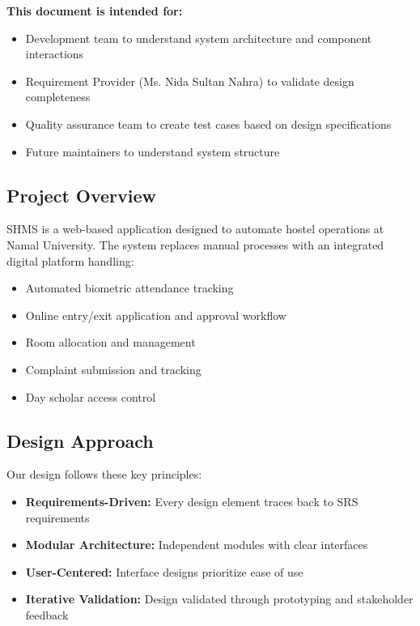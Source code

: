 \documentclass[12pt]{article}
\begin{document}
\textbf{This document is intended for:}

\begin{itemize}
\item Development team to understand system architecture and component interactions
\item Requirement Provider (Ms. Nida Sultan Nahra) to validate design completeness
\item Quality assurance team to create test cases based on design specifications
\item Future maintainers to understand system structure
\end{itemize}

\subsection{Project Overview}

SHMS is a web-based application designed to automate hostel operations at Namal University. The system replaces manual processes with an integrated digital platform handling:

\begin{itemize}
\item Automated biometric attendance tracking
\item Online entry/exit application and approval workflow
\item Room allocation and management
\item Complaint submission and tracking
\item Day scholar access control
\end{itemize}

\subsection{Design Approach}

Our design follows these key principles:

\begin{itemize}
\item \textbf{Requirements-Driven:} Every design element traces back to SRS requirements
\item \textbf{Modular Architecture:} Independent modules with clear interfaces
\item \textbf{User-Centered:} Interface designs prioritize ease of use
\item \textbf{Iterative Validation:} Design validated through prototyping and stakeholder feedback
\end{itemize}
\end{document}
